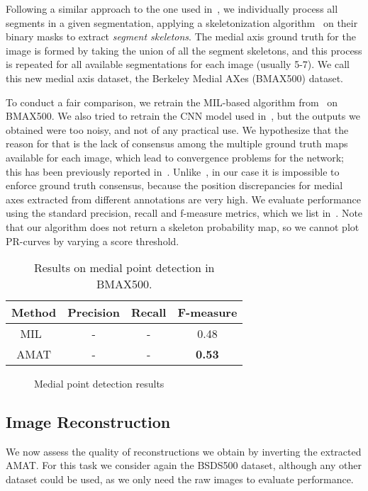 \documentclass[10pt,twocolumn,letterpaper]{article}
\begin{document}
Following a similar approach to the one used in~\cite{tsogkas2012learning,shen2016object}, 
we individually process all segments in a given segmentation, applying a skeletonization 
algorithm~\cite{telea2002augmented} on their binary masks to extract \emph{segment skeletons}.
The medial axis ground truth for the image is formed by taking the union of all the segment skeletons, and this
process is repeated for all available segmentations for each image (usually 5-7).
We call this new medial axis dataset, the Berkeley Medial AXes (BMAX500) dataset.

To conduct a fair comparison, we retrain the MIL-based algorithm from~\cite{tsogkas2012learning} on BMAX500.
We also tried to retrain the CNN model used in~\cite{shen2016object}, but the outputs we obtained were too noisy, 
and not of any practical use.
We hypothesize that the reason for that is the lack of consensus among the multiple ground truth maps
available for each image, which lead to convergence problems for the network; this has been previously
reported in~\cite{xie2015holistically}.
Unlike~\cite{xie2015holistically}, in our case it is impossible to enforce ground truth consensus,
because the position discrepancies for medial axes extracted from different annotations are very high.
We evaluate performance using the standard precision, recall and f-measure metrics, 
which we list in~.
Note that our algorithm does not return a skeleton probability map, so we cannot 
plot PR-curves by varying a score threshold.

\begin{table}
\centering
\begin{tabular}{|c|c|c|c|}
\hline
Method	&	Precision	&	Recall	&	F-measure \\
\hline
MIL~\cite{tsogkas2012learning}	&	-	& - 	& 	0.48 \\
\hline
AMAT	&	-&	-&	\bf{0.53} \\
\hline
\end{tabular}
\caption{Results on medial point detection in BMAX500.}
\label{tab:detection}
\end{table}

\begin{figure}[t]
\centering
\caption{Medial point detection results}
\label{fig:detection}
\end{figure}


\subsection{Image Reconstruction}\label{sec:experiments:reconstruction}
We now assess the quality of reconstructions we obtain by inverting the extracted AMAT.
For this task we consider again the BSDS500 dataset, although any other dataset could be used, 
as we only need the raw images to evaluate performance.
\end{document}
